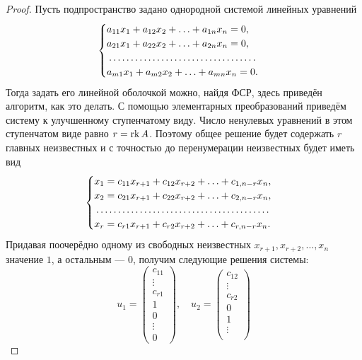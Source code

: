 \begin{proof}
    Пусть подпространство задано однородной системой линейных уравнений
    \[
        \begin{cases}
            a_{11}x_1 + a_{12}x_2 + \ldots + a_{1n}x_n = 0,\\
            a_{21}x_1 + a_{22}x_2 + \ldots + a_{2n}x_n = 0,\\
            \dotfill\\
            a_{m1}x_1 + a_{m2}x_2 + \ldots + a_{mn}x_n = 0.
        \end{cases}
    \]
    Тогда задать его линейной оболочкой можно, найдя ФСР, здесь приведён алгоритм, как это делать. С помощью элементарных преобразований приведём систему к улучшенному ступенчатому виду. Число ненулевых уравнений в этом ступенчатом виде равно $r = \operatorname{rk} A$. Поэтому общее решение будет содержать $r$ главных неизвестных и с точностью до перенумерации неизвестных будет иметь вид
    \[
        \begin{cases}
            x_1 = c_{11}x_{r + 1} + c_{12}x_{r + 2} + \ldots + c_{1, n - r}x_n,\\
            x_2 = c_{21}x_{r + 1} + c_{22}x_{r + 2} + \ldots + c_{2, n - r}x_n,\\
            \dotfill\\
            x_r = c_{r1}x_{r + 1} + c_{r2}x_{r + 2} + \ldots + c_{r, n - r}x_n.\\
        \end{cases}
    \]
    Придавая поочерёдно одному из свободных неизвестных $x_{r + 1}, x_{r + 2}, \ldots, x_n$ значение $1$, а остальным --- $0$, получим следующие решения системы:
    \[
        u_1 = 
        \begin{pmatrix}
            c_{11}\\
            \vdots\\
            c_{r1}\\
            1\\
            0\\
            \vdots\\
            0
        \end{pmatrix},\quad
        u_2 = 
        \begin{pmatrix}
            c_{12}\\
            \vdots\\
            c_{r2}\\
            0\\
            1\\
            \vdots\\

\end{pmatrix}\]
\end{proof}
